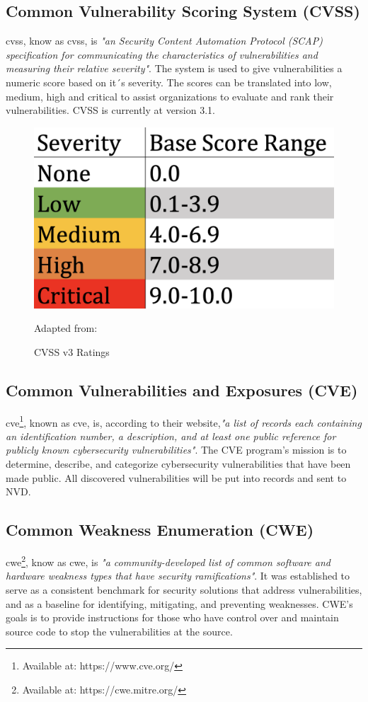 \subsection{Common Vulnerability Scoring System (CVSS)}
\acrlong{cvss}, know as \acrshort{cvss}, is \textit{"an Security Content Automation Protocol (SCAP) specification for communicating the characteristics of vulnerabilities and measuring their relative severity"}\cite{nistCVSS}. The system is used to give vulnerabilities a numeric score based on it´s severity. The scores can be translated into low, medium, high and critical to assist organizations to evaluate and rank their vulnerabilities. CVSS is currently at version 3.1. \cite{CVSS}
\begin{figure}[H]
    \centering
    \includegraphics[scale=0.3]{Images/CVSS.png}
    \caption{CVSS v3 Ratings} Adapted from:\cite{cvssrating}
    \label{fig:CVSS v3 Ratings}
\end{figure}


\subsection{Common Vulnerabilities and Exposures (CVE)}
\acrlong{cve}\footnote{Available at: https://www.cve.org/}, known as \acrshort{cve}, is, according to their website,\textit{"a list of records each containing an identification number, a description, and at least one public reference for publicly known cybersecurity vulnerabilities"}\cite{CVE}. The CVE program's mission is to determine, describe, and categorize cybersecurity vulnerabilities that have been made public. All discovered vulnerabilities will be put into records and sent to NVD.

\subsection{Common Weakness Enumeration (CWE)}
\acrlong{cwe}\footnote{Available at: https://cwe.mitre.org/}, know as \acrshort{cwe}, is \textit{"a community-developed list of common software and hardware weakness types that have security ramifications"}\cite{CWE}. It was established to serve as a consistent benchmark for security solutions that address vulnerabilities, and as a baseline for identifying, mitigating, and preventing weaknesses. CWE's goals is to provide instructions for those who have control over and maintain source code to stop the vulnerabilities at the source. 

